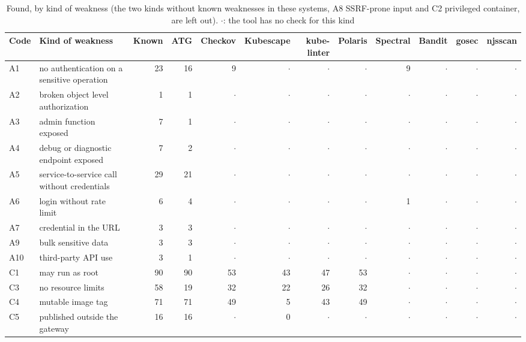 \documentclass[conference]{IEEEtran}
\begin{document}
\begin{table}[!t]
\caption{Found, by kind of weakness (the two kinds without known weaknesses in these systems, A8 SSRF-prone input and C2 privileged container, are left out). $\cdot$: the tool has no check for this kind}
\label{tab:kinds}
\centering
\scriptsize
\setlength{\tabcolsep}{3.5pt}
\begin{tabular}{@{}l>{\raggedright\arraybackslash}p{4.6cm}rrrrrrrrrr@{}}
\toprule
Code & Kind of weakness & Known & ATG & Checkov & Kubescape & kube-linter & Polaris & Spectral & Bandit & gosec & njsscan \\
\midrule
A1 & no authentication on a sensitive operation & 23 & 16 & 9 & $\cdot$ & $\cdot$ & $\cdot$ & 9 & $\cdot$ & $\cdot$ & $\cdot$ \\
A2 & broken object level authorization & 1 & 1 & $\cdot$ & $\cdot$ & $\cdot$ & $\cdot$ & $\cdot$ & $\cdot$ & $\cdot$ & $\cdot$ \\
A3 & admin function exposed & 7 & 1 & $\cdot$ & $\cdot$ & $\cdot$ & $\cdot$ & $\cdot$ & $\cdot$ & $\cdot$ & $\cdot$ \\
A4 & debug or diagnostic endpoint exposed & 7 & 2 & $\cdot$ & $\cdot$ & $\cdot$ & $\cdot$ & $\cdot$ & $\cdot$ & $\cdot$ & $\cdot$ \\
A5 & service-to-service call without credentials & 29 & 21 & $\cdot$ & $\cdot$ & $\cdot$ & $\cdot$ & $\cdot$ & $\cdot$ & $\cdot$ & $\cdot$ \\
A6 & login without rate limit & 6 & 4 & $\cdot$ & $\cdot$ & $\cdot$ & $\cdot$ & 1 & $\cdot$ & $\cdot$ & $\cdot$ \\
A7 & credential in the URL & 3 & 3 & $\cdot$ & $\cdot$ & $\cdot$ & $\cdot$ & $\cdot$ & $\cdot$ & $\cdot$ & $\cdot$ \\
A9 & bulk sensitive data & 3 & 3 & $\cdot$ & $\cdot$ & $\cdot$ & $\cdot$ & $\cdot$ & $\cdot$ & $\cdot$ & $\cdot$ \\
A10 & third-party API use & 3 & 1 & $\cdot$ & $\cdot$ & $\cdot$ & $\cdot$ & $\cdot$ & $\cdot$ & $\cdot$ & $\cdot$ \\
\midrule
C1 & may run as root & 90 & 90 & 53 & 43 & 47 & 53 & $\cdot$ & $\cdot$ & $\cdot$ & $\cdot$ \\
C3 & no resource limits & 58 & 19 & 32 & 22 & 26 & 32 & $\cdot$ & $\cdot$ & $\cdot$ & $\cdot$ \\
C4 & mutable image tag & 71 & 71 & 49 & 5 & 43 & 49 & $\cdot$ & $\cdot$ & $\cdot$ & $\cdot$ \\
C5 & published outside the gateway & 16 & 16 & $\cdot$ & 0 & $\cdot$ & $\cdot$ & $\cdot$ & $\cdot$ & $\cdot$ & $\cdot$ \\

\end{tabular}
\end{table}
\end{document}
